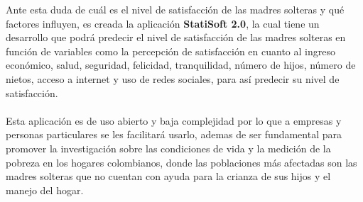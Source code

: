 \documentclass[11pt,twoside]{article}
\begin{document}
\noindent
Ante esta duda de cuál es el nivel de satisfacción de las madres solteras y qué factores influyen, es creada la aplicación \textbf{StatiSoft 2.0}, la cual tiene un desarrollo que podrá predecir el nivel de satisfacción de las madres solteras en función de variables como la percepción de satisfacción en cuanto al ingreso económico, salud, seguridad, felicidad, tranquilidad, número de hijos, número de nietos, acceso a internet y uso de redes sociales, para así predecir su nivel de satisfacción.
\\
\\
Esta aplicación es de  uso abierto y  baja complejidad por lo que a empresas y personas particulares  se les facilitará usarlo, ademas de ser fundamental para promover la investigación sobre las condiciones de vida y la medición de la pobreza en los hogares colombianos, donde las poblaciones más afectadas son las madres solteras que no cuentan con ayuda para la crianza de sus hijos y el manejo del hogar.




\end{document}
